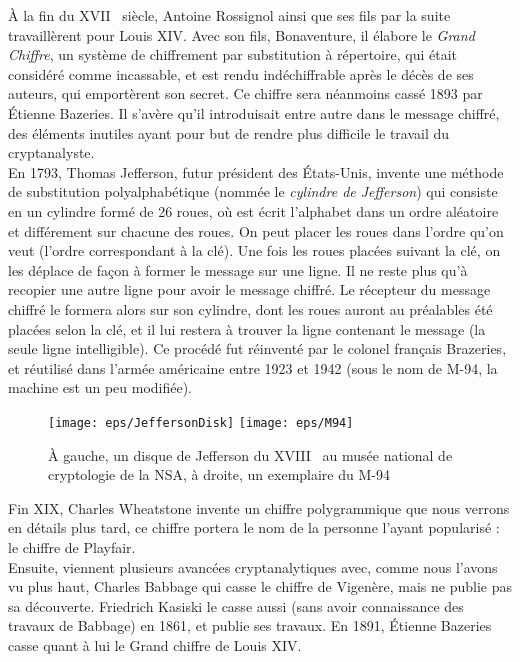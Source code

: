 À la fin du XVII\ieme~ siècle, Antoine Rossignol ainsi que ses
fils par la suite travaillèrent pour Louis XIV. Avec son fils,
Bonaventure, il élabore le \emph{Grand Chiffre}, un système de
chiffrement par substitution à répertoire, qui était considéré comme
incassable, et est rendu indéchiffrable après le décès de ses auteurs,
qui emportèrent son secret. Ce chiffre sera néanmoins cassé 1893 par
Étienne Bazeries. Il s'avère qu'il introduisait entre autre
dans le message chiffré, des éléments inutiles ayant pour but de
rendre plus difficile le travail du cryptanalyste.\\

En 1793, Thomas Jefferson, futur président des États-Unis,
invente une méthode de substitution polyalphabétique (nommée le
\emph{cylindre de Jefferson}) qui consiste en
un cylindre formé de 26 roues, où est écrit l'alphabet dans un ordre
aléatoire et différement sur chacune des roues. On peut placer les
roues dans l'ordre qu'on veut (l'ordre correspondant à la clé).
Une fois les roues placées suivant la clé, on les déplace de façon à
former le message sur une ligne. Il ne reste plus qu'à recopier une
autre ligne pour avoir le message chiffré. Le récepteur du message
chiffré le formera alors sur son cylindre, dont les roues auront au
préalables été placées selon la clé, et il lui restera à trouver la
ligne contenant le message (la seule ligne intelligible). Ce procédé
fut réinventé par le colonel français Brazeries, et réutilisé
dans l'armée américaine entre 1923 et 1942 (sous le nom de M-94, la
machine est un peu modifiée).

\begin{figure}[h]
  \begin{center}
    \texttt{[image: eps/JeffersonDisk]}
    \hfill
    \texttt{[image: eps/M94]}
  \end{center}
  \caption{À gauche, un disque de Jefferson du XVIII\ieme~ au musée
    national de cryptologie de la NSA, 
    à droite, un exemplaire du M-94}
  \label{fig:JeffersonDisk}
\end{figure}

Fin XIX\ieme, Charles Wheatstone invente un chiffre
polygrammique que nous verrons en détails plus tard, ce chiffre
portera le nom de la personne l'ayant popularisé : le chiffre
  de Playfair. \\

Ensuite, viennent plusieurs avancées cryptanalytiques avec, comme nous
l'avons vu plus haut, Charles Babbage qui casse le chiffre de
Vigenère, mais ne publie pas sa découverte. Friedrich Kasiski
le casse aussi (sans avoir connaissance des travaux de
Babbage) en 1861, et publie ses travaux. En 1891, Étienne
  Bazeries casse quant à lui le Grand chiffre de Louis XIV. 

